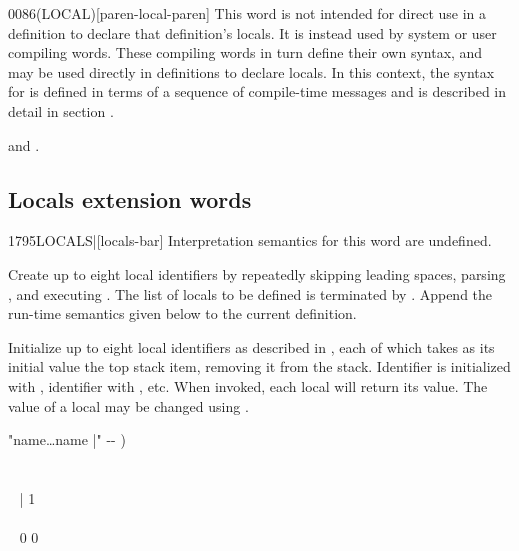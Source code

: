 \begin{worddef}[LOCAL]{0086}{(LOCAL)}[paren-local-paren]
\note
	This word is not intended for direct use in a definition to
	declare that definition's locals. It is instead used by system
	or user compiling words. These compiling words in turn define
	their own syntax, and may be used directly in definitions to
	declare locals. In this context, the syntax for 
	is defined in terms of a sequence of compile-time messages and
	is described in detail in section .

\see {} and
	.
\end{worddef}


\subsection{Locals extension words} %
\extended

\begin{worddef}[LOCALS]{1795}{LOCALS|}[locals-bar]
\interpret
	Interpretation semantics for this word are undefined.

\compile

	Create up to eight local identifiers by repeatedly skipping
	leading spaces, parsing , and executing
	. The list of locals to be defined
	is terminated by \param{|}. Append the run-time semantics given
	below to the current definition.

\runtime

	Initialize up to eight local identifiers as described in
	, each of which takes as its
	initial value the top stack item, removing it from the stack.
	Identifier  is initialized with ,
	identifier  with , etc. When invoked,
	each local will return its value. The value of a local may be
	changed using .

	\begin{implement}
	\word{:}   "name{\ldots}name |" -{}- ) \\
	\tab {} \\
	\tab~   ~    \\
	\tab~ \word{[CHAR]} | \word{-}  1 \word{-}  ~  \\
	\tab~  \\
	\tab {}  ~ 0 0  \\
	\word{;} 
	\end{implement}

\end{worddef}

